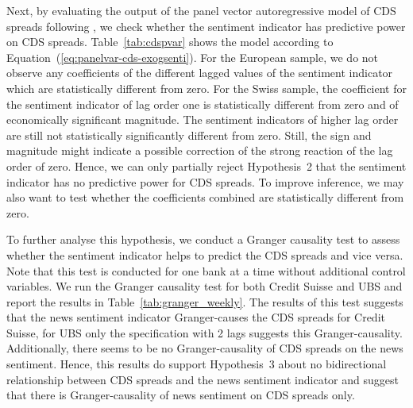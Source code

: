 

Next, by evaluating the output of the panel vector autoregressive model of CDS spreads following \cite{cathcart2020}, we check whether the sentiment indicator has predictive power on CDS spreads. \mbox{Table~\ref{tab:cdspvar}} shows the model according to \mbox{Equation~(\ref{eq:panelvar-cds-exogsenti})}. For the European sample, we do not observe any coefficients of the different lagged values of the sentiment indicator which are statistically different from zero. For the Swiss sample, the coefficient for the sentiment indicator of lag order one is statistically different from zero and of economically significant magnitude. The sentiment indicators of higher lag order are still not statistically significantly different from zero. Still, the sign and magnitude might indicate a possible correction of the strong reaction of the lag order of zero. Hence, we can only partially reject \mbox{Hypothesis~2} that the sentiment indicator has no predictive power for CDS spreads. To improve inference, we may also want to test whether the coefficients combined are statistically different from zero.



To further analyse this hypothesis, we conduct a Granger causality test to assess whether the sentiment indicator helps to predict the CDS spreads and vice versa. Note that this test is conducted for one bank at a time without additional control variables. We run the Granger causality test for both Credit Suisse and UBS and report the results in \mbox{Table~\ref{tab:granger_weekly}}. The results of this test suggests that the news sentiment indicator Granger-causes the CDS spreads for Credit Suisse, for UBS only the specification with 2 lags suggests this Granger-causality. Additionally, there seems to be no Granger-causality of CDS spreads on the news sentiment. Hence, this results do support \mbox{Hypothesis~3} about no bidirectional relationship between CDS spreads and the news sentiment indicator and suggest that there is Granger-causality of news sentiment on CDS spreads only. \\



